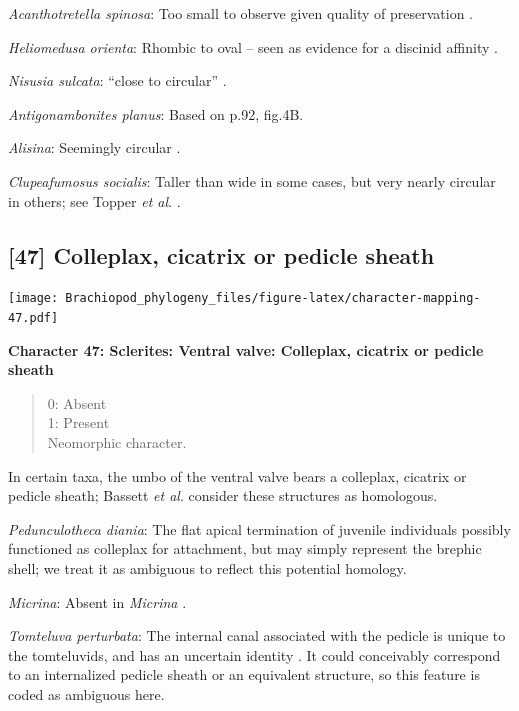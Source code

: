 \documentclass[]{book}
\theoremstyle{definition}
\theoremstyle{definition}
\theoremstyle{definition}
\theoremstyle{remark}
\begin{document}
\emph{Acanthotretella spinosa}: Too small to observe given quality of
preservation \citep{Holmer2006Aspinose}.

\emph{Heliomedusa orienta}: Rhombic to oval -- seen as evidence for a
discinid affinity \citep{Chen2007Reinterpretationof}.

\emph{Nisusia sulcata}: ``close to circular''
\citep{Holmer2018Evolutionarysignificance}.

\emph{Antigonambonites planus}: Based on p.92, fig.4B.

\emph{Alisina}: Seemingly circular \citep{Zhang2011Anobolellate}.

\emph{Clupeafumosus socialis}: Taller than wide in some cases, but very
nearly circular in others; see Topper \emph{et al}.
\citeyearpar{Topper2013Reappraisalof}.

\hypertarget{colleplax-cicatrix-or-pedicle-sheath}{%
\subsection*{{[}47{]} Colleplax, cicatrix or pedicle
sheath}\label{colleplax-cicatrix-or-pedicle-sheath}}

\texttt{[image: Brachiopod\_phylogeny\_files/figure-latex/character-mapping-47.pdf]}

\textbf{Character 47: Sclerites: Ventral valve: Colleplax, cicatrix or
pedicle sheath}

\begin{quote}
0: Absent\\
1: Present\\
Neomorphic character.
\end{quote}

In certain taxa, the umbo of the ventral valve bears a colleplax,
cicatrix or pedicle sheath; Bassett \emph{et al}.
\citeyearpar{Bassett2008Earlyontogeny} consider these structures as
homologous.

\emph{Pedunculotheca diania}: The flat apical termination of juvenile
individuals possibly functioned as colleplax for attachment, but may
simply represent the brephic shell; we treat it as ambiguous to reflect
this potential homology.

\emph{Micrina}: Absent in \emph{Micrina} \citep{Holmer2011Firstrecord}.

\emph{Tomteluva perturbata}: The internal canal associated with the
pedicle is unique to the tomteluvids, and has an uncertain identity
\citep{Streng2016Anew}. It could conceivably correspond to an
internalized pedicle sheath or an equivalent structure, so this feature
is coded as ambiguous here.
\end{document}
